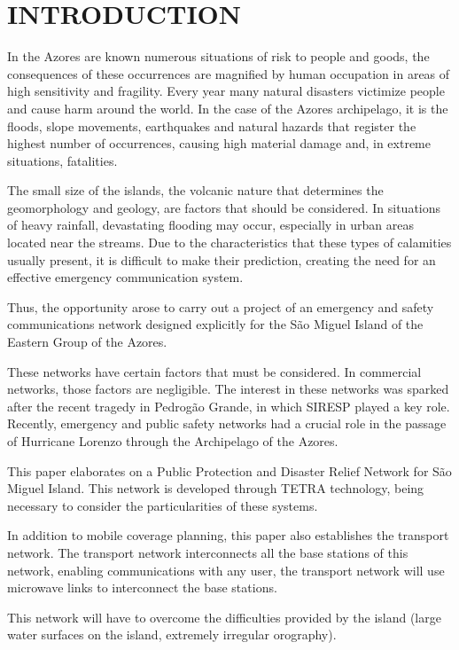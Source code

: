 \documentclass[letterpaper, 10 pt, conference]{ieeeconf}  %
\begin{document}
\section{INTRODUCTION}
\noindent In the Azores are known numerous situations of risk to people and goods, the consequences of these occurrences are magnified by human occupation in areas of high sensitivity and fragility.
Every year many natural disasters victimize people and cause harm around the world. In the case of the Azores archipelago, it is the floods, slope movements, earthquakes and natural hazards that register the highest number of occurrences, causing high material damage and, in extreme situations, fatalities. \par \noindent
The small size of the islands, the volcanic nature that determines the geomorphology and geology, are factors that should be considered. In situations of heavy rainfall, devastating flooding may occur, especially in urban areas located near the streams. 
Due to the characteristics that these types of calamities usually present, it is difficult to make their prediction, creating the need for an effective emergency communication system. \par \noindent
Thus, the opportunity arose to carry out a project of an emergency and safety communications network designed explicitly for the São Miguel Island of the Eastern Group of the Azores.\par\noindent
These networks have certain factors that must be considered. In commercial networks, those factors are negligible. The interest in these networks was sparked after the recent tragedy in Pedrogão Grande, in which SIRESP played a key role. Recently, emergency and public safety networks had a crucial role in the passage of Hurricane Lorenzo through the Archipelago of the Azores.\par\noindent
This paper elaborates on a Public Protection and Disaster Relief Network for São Miguel Island. This network is developed through TETRA technology, being necessary to consider the particularities of these systems.\par\noindent
In addition to mobile coverage planning, this paper also establishes the transport network. The transport network interconnects all the base stations of this network, enabling communications with any user, the transport network will use microwave links to interconnect the base stations. \par\noindent
This network will have to overcome the difficulties provided by the island (large water surfaces on the island, extremely irregular orography).
\end{document}
